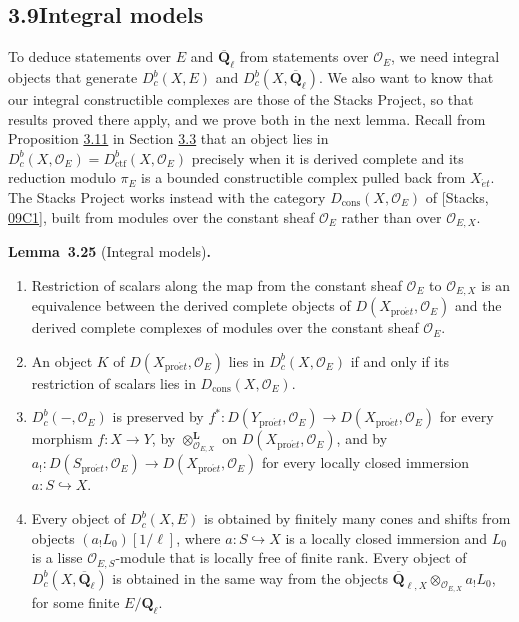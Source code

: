 \documentclass[11pt]{article}
\newenvironment{bpstatement}[2]{\par\addvspace{0.6\baselineskip}\noindent\textbf{#1}#2\textbf{.}\enspace\ignorespaces}
  {\par\addvspace{0.4\baselineskip}}
\newenvironment{bpstatementit}[2]{\begin{bpstatement}{#1}{#2}\itshape\ignorespaces}{\end{bpstatement}}
\providecommand{\Dbc}{}\renewcommand{\Dbc}{D^b_c}
\providecommand{\Dc}{}\renewcommand{\Dc}{D_{\mathrm{cons}}}
\providecommand{\QbarX}{}\renewcommand{\QbarX}{\overline{\mathbf Q}_{\ell,X}}
\begin{document}
\subsection*{\texorpdfstring{3.9\quad Integral models}{3.9 Integral models}}
\label{bp272}%
\label{bp273}%
To deduce statements over \(E\) and \(\overline{\mathbf Q}_\ell\) from statements over \(\mathcal O_E\), we need integral objects that generate \(\Dbc(X,E)\) and \(\Dbc(X,\overline{\mathbf Q}_\ell)\). We also want to know that our integral constructible complexes are those of the Stacks Project, so that results proved there apply, and we prove both in the next lemma. Recall from Proposition \hyperref[bp226]{3.11} in Section \hyperref[bp205]{3.3} that an object lies in \(\Dbc(X,\mathcal O_E)=D^b_{\mathrm{ctf}}(X,\mathcal O_E)\) precisely when it is derived complete and its reduction modulo \(\pi_E\) is a bounded constructible complex pulled back from \(X_{\acute{e}t}\). The Stacks Project works instead with the category \(\Dc(X,\mathcal O_E)\) of [Stacks, \href{https://stacks.math.columbia.edu/tag/09C1}{09C1}], built from modules over the constant sheaf \(\mathcal O_E\) rather than over \(\mathcal O_{E,X}\).

\label{bp274}%
\begin{bpstatementit}{Lemma~3.25}{ (Integral models)}
\begin{enumerate}
\item Restriction of scalars along the map from the constant sheaf \(\mathcal O_E\) to \(\mathcal O_{E,X}\) is an equivalence between the derived complete objects of \(D(X_{\mathrm{pro}\acute{e}t},\mathcal O_E)\) and the derived complete complexes of modules over the constant sheaf \(\mathcal O_E\).
\item An object \(K\) of \(D(X_{\mathrm{pro}\acute{e}t},\mathcal O_E)\) lies in \(\Dbc(X,\mathcal O_E)\) if and only if its restriction of scalars lies in \(\Dc(X,\mathcal O_E)\).
\item \(\Dbc(-,\mathcal O_E)\) is preserved by \(f^*:D(Y_{\mathrm{pro}\acute{e}t},\mathcal O_E)\to D(X_{\mathrm{pro}\acute{e}t},\mathcal O_E)\) for every morphism \(f:X\to Y\), by \(\otimes^{\mathbf L}_{\mathcal O_{E,X}}\) on \(D(X_{\mathrm{pro}\acute{e}t},\mathcal O_E)\), and by \(a_!:D(S_{\mathrm{pro}\acute{e}t},\mathcal O_E)\to D(X_{\mathrm{pro}\acute{e}t},\mathcal O_E)\) for every locally closed immersion \(a:S\hookrightarrow X\).
\item Every object of \(\Dbc(X,E)\) is obtained by finitely many cones and shifts from objects \((a_!L_0)[1/\ell]\), where \(a:S\hookrightarrow X\) is a locally closed immersion and \(L_0\) is a lisse \(\mathcal O_{E,S}\)-module that is locally free of finite rank. Every object of \(\Dbc(X,\overline{\mathbf Q}_\ell)\) is obtained in the same way from the objects \(\QbarX\otimes_{\mathcal O_{E,X}}a_!L_0\), for some finite \(E/\mathbf Q_\ell\).
\end{enumerate}
\end{bpstatementit}
\end{document}
